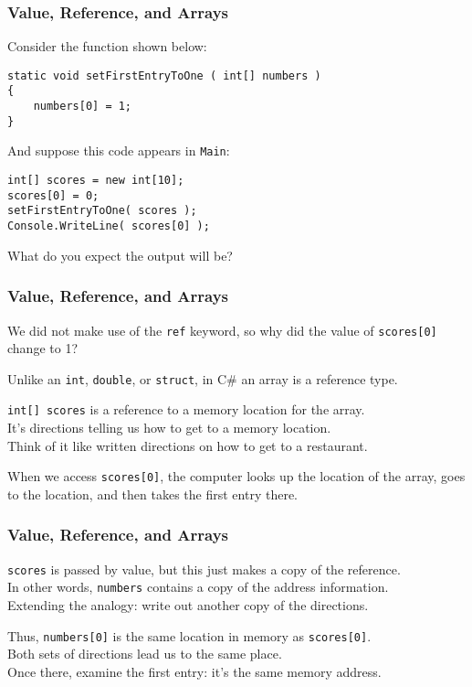 \begin{frame}[fragile]
\frametitle{Value, Reference, and Arrays}

Consider the function shown below:

\begin{verbatim}
static void setFirstEntryToOne ( int[] numbers )
{
    numbers[0] = 1;
}
\end{verbatim}

And suppose this code appears in \texttt{Main}:
\begin{verbatim}
int[] scores = new int[10];
scores[0] = 0;
setFirstEntryToOne( scores );
Console.WriteLine( scores[0] );
\end{verbatim}

What do you expect the output will be?

\end{frame}

\begin{frame}
\frametitle{Value, Reference, and Arrays}
We did not make use of the \texttt{ref} keyword, so why did the value of \texttt{scores[0]} change to 1?

Unlike an \texttt{int}, \texttt{double}, or \texttt{struct}, in C\# an array is a \alert{reference type}.

\texttt{int[] scores} is a reference to a memory location for the array.\\
\quad It's directions telling us how to get to a memory location.\\
\quad Think of it like written directions on how to get to a restaurant.

When we access \texttt{scores[0]}, the computer looks up the location of the array, goes to the location, and then takes the first entry there.

\end{frame}

\begin{frame}
\frametitle{Value, Reference, and Arrays}
\texttt{scores} is passed by value, but this just makes a copy of the reference.\\
\quad In other words, \texttt{numbers} contains a copy of the address information.\\
\quad Extending the analogy: write out another copy of the directions.

Thus, \texttt{numbers[0]} is the same location in memory as \texttt{scores[0]}.\\
\quad Both sets of directions lead us to the same place.\\
\quad Once there, examine the first entry: it's the same memory address.

\end{frame}

